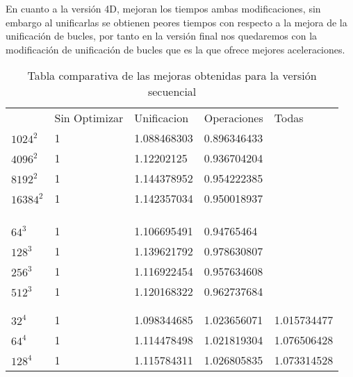 En cuanto a la versión 4D, mejoran los tiempos ambas modificaciones, sin embargo al unificarlas se obtienen peores tiempos con respecto a la mejora de la unificación de bucles, por tanto en la versión final nos quedaremos con la modificación de unificación de bucles que es la que ofrece mejores aceleraciones.

\begin{table}[H]
    \centering
    \begin{tabular}{lllll}
          & Sin Optimizar & Unificacion & Operaciones & Todas        \\
    $1024^2$ & 1             & 1.088468303 & 0.896346433 &              \\
    $4096^2$ & 1             & 1.12202125  & 0.936704204 &              \\
    $8192^2$ & 1             & 1.144378952 & 0.954222385 &              \\
    $16384^2$ & 1             & 1.142357034 & 0.950018937 &              \\
          &               &             &             &              \\
          &               &             &             &              \\
          &               &             &             &              \\
    $64^3$   & 1             & 1.106695491 & 0.94765464  &              \\
    $128^3$   & 1             & 1.139621792 & 0.978630807 &              \\
    $256^3$   & 1             & 1.116922454 & 0.957634608 &              \\
    $512^3$   & 1             & 1.120168322 & 0.962737684 &              \\
          &               &             &             &              \\
          &               &             &             &              \\
    $32^4$   & 1             & 1.098344685 & 1.023656071 & 1.015734477  \\
    $64^4$   & 1             & 1.114478498 & 1.021819304 & 1.076506428  \\
    $128^4$   & 1             & 1.115784311 & 1.026805835 & 1.073314528 
    \end{tabular}
    \caption{Tabla comparativa de las mejoras obtenidas para la versión secuencial}
    \label{MejorasSecuencial}
\end{table}